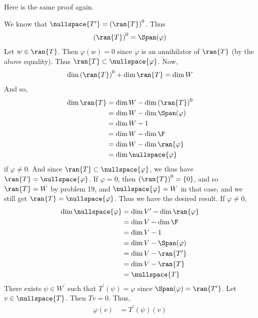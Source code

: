 \documentclass{book}
\begin{document}
\begin{enumerate}[label=\arabic*)]
      Here is the same proof again.

      We know that $\nullspace{T^{\prime}} = \left( \ran{T} \right)^0$. Thus
      \begin{align*}
        \left( \ran{T} \right)^0 = \Span(\varphi)
      \end{align*}
      Let $w \in \ran{T}$. Then $\varphi(w) = 0$ since $\varphi$ is an annihilator of $\ran{T}$ (by the above equality). Thus $\ran{T} \subset \nullspace{\varphi}$. Now,
      \begin{align*}
        \dim{\left( \ran{T} \right)^0} + \dim{\ran{T}} & = \dim{W} \\
      \end{align*}
      And so,
      \begin{align*}
        \dim{\ran{T}} & = \dim{W} - \dim{\left( \ran{T} \right)^0} \\
        & = \dim{W} - \dim{\Span(\varphi)} \\
        & = \dim{W} - 1 \\
        & = \dim{W} - \dim{\F} \\
        & = \dim{W} - \dim{\ran{\varphi}} \\
        & = \dim{\nullspace{\varphi}}
      \end{align*}
      if $\varphi \neq 0$. And since $\ran{T} \subset \nullspace{\varphi}$, we thus have $\ran{T} = \nullspace{\varphi}$. If $\varphi = 0$, then $\left( \ran{T} \right)^0 = \{0\}$, and so
      $\ran{T} = W$ by problem 19, and $\nullspace{\varphi} = W$ in that case, and we still get $\ran{T} = \nullspace{\varphi}$. Thus we have the desired result.
    \ii
      If $\varphi \neq 0$,
      \begin{align*}
        \dim{\nullspace{\varphi}} & = \dim{V^{\prime}} - \dim{\ran{\varphi}} \\
        & = \dim{V} - \dim{\F} \\
        & = \dim{V} - 1 \\
        & = \dim{V} - \Span(\varphi) \\
        & = \dim{V} - \ran{T^{\prime}} \\
        & = \dim{V} - \ran{T} \\
        & = \nullspace{T}
      \end{align*}
      There exists $\psi \in W^{\prime}$ such that $T^{\prime}(\psi) = \varphi$ since $\Span(\varphi) = \ran{T^{\prime}}$. Let $v \in \nullspace{T}$. Then $Tv = 0$. Thus,
      \begin{align*}
        \varphi(v) & = T^{\prime}(\psi)(v) \\

\end{align*}
\end{enumerate}
\end{document}
